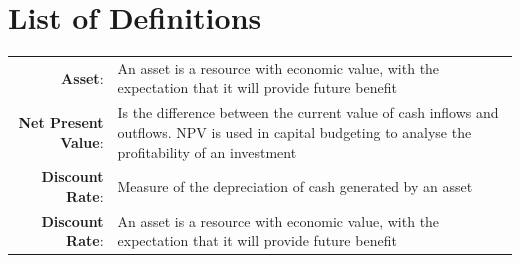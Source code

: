 \documentclass[fontsize=9.5pt]{extarticle}
\numberwithin{figure}{section} %
\begin{document}
\section*{List of Definitions}\label{defs}
\begin{tabular}{r p{12cm}}
\textbf{Asset}:& An asset is a resource with economic value, with the expectation that it will provide future benefit \\
\textbf{Net Present Value}:& Is the difference between the current value of cash inflows and outflows. NPV is used in capital budgeting to analyse the profitability of an investment \\
\textbf{Discount Rate}:& Measure of the depreciation of cash generated by an asset \\
\textbf{Discount Rate}:& An asset is a resource with economic value, with the expectation that it will provide future benefit \\
\end{tabular}

\newpage
\end{document}
